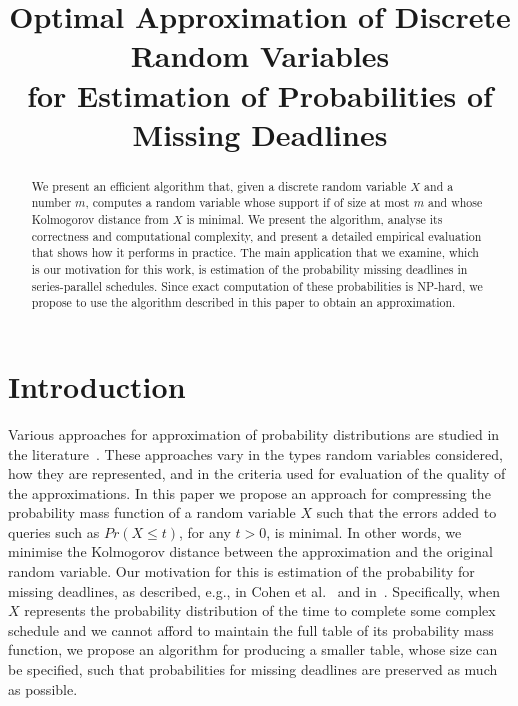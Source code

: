 \documentclass[letterpaper]{article} %
\begin{document}
\title{Optimal Approximation of Discrete Random Variables \\ for Estimation of Probabilities of Missing Deadlines}
\author{}
\maketitle
\begin{abstract}
We present an efficient algorithm that, given a discrete random variable $X$ and a number $m$, computes a random variable whose support if of size at most $m$ and whose Kolmogorov distance from $X$ is minimal. We present the algorithm, analyse its correctness and computational complexity, and present a detailed empirical evaluation that shows how it performs in practice. The main application that we examine, which is our motivation for this work, is estimation of the probability missing deadlines in series-parallel schedules. Since exact computation of these probabilities is NP-hard, we propose to use the algorithm described in this paper to obtain an approximation.   
\end{abstract}


\section{Introduction}


Various approaches for approximation of probability distributions are studied in the literature~\cite{PS77,AMCR83,vidyasagar2012metric,cohen2015estimating,pavlikov2016cvar,CohenGW18}. 
These approaches vary in the types random variables considered, how they are represented, and in the criteria used for evaluation of the quality of the approximations. In this paper we propose an approach for compressing the probability mass function of a random variable $X$ such that the errors added to queries such as $Pr(X\leq t)$, for  any $t>0$, is minimal. In other words, we minimise the Kolmogorov distance between the approximation and the original random variable. Our motivation for this is estimation of the probability for missing deadlines, as described, e.g., in Cohen et al.~\cite{cohen2015estimating,CohenGW18} and in~\cite{Kashef18}. Specifically, when $X$ represents the probability distribution of the time to complete some complex schedule and we cannot afford to maintain the full table of its probability mass function, we propose an algorithm for producing a smaller table, whose size can be specified, such that probabilities for missing deadlines are preserved as much as possible. 
\end{document}
